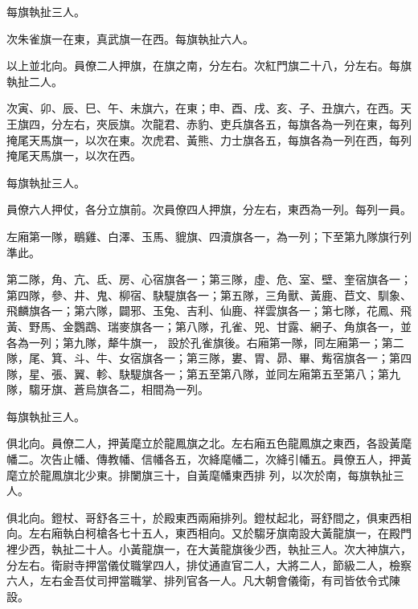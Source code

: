 \begin{pinyinscope}
 每旗執扯三人。



 次朱雀旗一在東，真武旗一在西。每旗執扯六人。



 以上並北向。員僚二人押旗，在旗之南，分左右。次紅門旗二十八，分左右。每旗執扯二人。



 次寅、卯、辰、巳、午、未旗六，在東；申、酉、戌、亥、子、丑旗六，在西。天王旗四，分左右，夾辰旗。次龍君、赤豹、吏兵旗各五，每旗各為一列在東，每列掩尾天馬旗一，以次在東。次虎君、黃熊、力士旗各五，每旗各為一列在西，每列掩尾天馬旗一，以次在西。



 每旗執扯三人。



 員僚六人押仗，各分立旗前。次員僚四人押旗，分左右，東西為一列。每列一員。



 左廂第一隊，鶡雞、白澤、玉馬、貔旗、四瀆旗各一，為一列；下至第九隊旗行列準此。



 第二隊，角、亢、氐、房、心宿旗各一；第三隊，虛、危、室、壁、奎宿旗各一；第四隊，參、井、鬼、柳宿、駃騠旗各一；第五隊，三角獸、黃鹿、苣文、馴象、飛麟旗各一；第六隊，闢邪、玉兔、吉利、仙鹿、祥雲旗各一；第七隊，花鳳、飛黃、野馬、金鸚鵡、瑞麥旗各一；第八隊，孔雀、兕、甘露、網子、角旗各一，並各為一列；第九隊，犛牛旗一，
 設於孔雀旗後。右廂第一隊，同左廂第一；第二隊，尾、箕、斗、牛、女宿旗各一；第三隊，婁、胃、昴、畢、觜宿旗各一；第四隊，星、張、翼、軫、駃騠旗各一；第五至第八隊，並同左廂第五至第八；第九隊，騶牙旗、蒼烏旗各二，相間為一列。



 每旗執扯三人。



 俱北向。員僚二人，押黃麾立於龍鳳旗之北。左右廂五色龍鳳旗之東西，各設黃麾幡二。次告止幡、傳教幡、信幡各五，次絳麾幡二，次絳引幡五。員僚五人，押黃麾立於龍鳳旗北少東。排闌旗三十，自黃麾幡東西排
 列，以次於南，每旗執扯三人。



 俱北向。鐙杖、哥舒各三十，於殿東西兩廂排列。鐙杖起北，哥舒間之，俱東西相向。左右廂執白柯槍各七十五人，東西相向。又於騶牙旗南設大黃龍旗一，在殿門裡少西，執扯二十人。小黃龍旗一，在大黃龍旗後少西，執扯三人。次大神旗六，分左右。衛尉寺押當儀仗職掌四人，排仗通直官二人，大將二人，節級二人，檢察六人，左右金吾仗司押當職掌、排列官各一人。凡大朝會儀衛，有司皆依令式陳
 設。




\end{pinyinscope}
